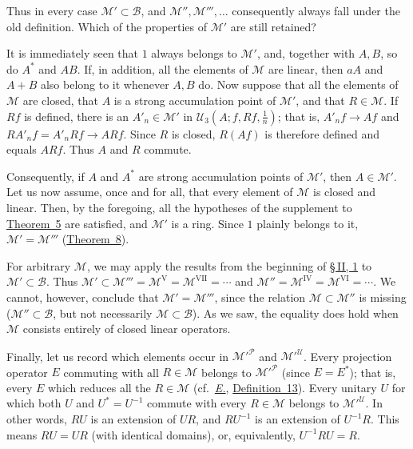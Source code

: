 \documentclass[
  paper=b5,
  twoside=true,
  fontsize=13pt,
  headings=normal,
  bookmarkpackage=false
]{scrartcl}
\theoremstyle{definition}
\newcommand{\TheoremRef}[1]{\hyperref[thm:#1]{Theorem~#1}}
\newcommand{\Eref}{\hyperref[fn:E-paper]{\emph{E.}}}
\newcommand{\ErefText}[1]{\href{https://doi.org/10.1007/BF01782338}{#1}}
\begin{document}
Thus in every case \(\mathcal M'\subset\mathcal B\), and
\(\mathcal M'',\mathcal M''',\ldots\) consequently always fall under
the old definition.  Which of the properties of \(\mathcal M'\) are
still retained?

It is immediately seen that \(1\) always belongs to \(\mathcal M'\),
and, together with \(A,B\), so do \(A^*\) and \(AB\).  If, in addition,
all the elements of \(\mathcal M\) are linear, then \(aA\) and \(A+B\)
also belong to it whenever \(A,B\) do.  Now suppose that all the
elements of \(\mathcal M\) are closed, that \(A\) is a strong
accumulation point of \(\mathcal M'\), and that \(R\in\mathcal M\).
If \(Rf\) is defined, there is an \(A'_n\in\mathcal M'\) in
\(\mathcal U_3(A;f,Rf,\frac1n)\); that is, \(A'_nf\to Af\) and
\(RA'_nf=A'_nRf\to ARf\). Since \(R\) is closed, \(R(Af)\) is therefore defined and equals
\(ARf\).  Thus \(A\) and \(R\) commute.

Consequently, if \(A\) and \(A^*\) are strong accumulation points of
\(\mathcal M'\), then \(A\in\mathcal M'\).  Let us now assume, once and
for all, that every element of \(\mathcal M\) is closed and linear.
Then, by the foregoing, all the hypotheses of the supplement to
\TheoremRef{5} are satisfied, and \(\mathcal M'\) is a ring.  Since \(1\)
plainly belongs to it, \(\mathcal M'=\mathcal M'''\) (\TheoremRef{8}).

For arbitrary \(\mathcal M\), we may apply the results from the beginning
of \hyperref[sec:ring-and-commutant-1]{\S\,II, 1} to
\(\mathcal M'\subset\mathcal B\). Thus
\(\mathcal M'\subset\mathcal M'''=\mathcal M^{\mathrm V}
=\mathcal M^{\mathrm{VII}}=\cdots\) and
\(\mathcal M''=\mathcal M^{\mathrm{IV}}
=\mathcal M^{\mathrm{VI}}=\cdots\). We cannot, however, conclude that \(\mathcal M'=\mathcal M'''\), since
the relation \(\mathcal M\subset\mathcal M''\) is missing
(\(\mathcal M''\subset\mathcal B\), but not necessarily
\(\mathcal M\subset\mathcal B\)).  As we saw, the equality does hold
when \(\mathcal M\) consists entirely of closed linear operators.

Finally, let us record which elements occur in
\(\mathcal M'^{\mathcal P}\) and \(\mathcal M'^{\mathcal U}\).  Every projection
operator \(E\) commuting with all \(R\in\mathcal M\) belongs to
\(\mathcal M'^{\mathcal P}\) (since \(E=E^*\)); that is, every \(E\) which
reduces all the \(R\in\mathcal M\) (cf.\ \Eref, \ErefText{Definition~13}).
Every unitary \(U\) for which both \(U\) and \(U^*=U^{-1}\) commute with
every \(R\in\mathcal M\) belongs to \(\mathcal M'^{\mathcal U}\).  In other
words, \(RU\) is an extension of \(UR\), and \(RU^{-1}\) is an extension
of \(U^{-1}R\). This means \(RU=UR\) (with identical domains),
or, equivalently, \(U^{-1}RU=R\).
\end{document}
